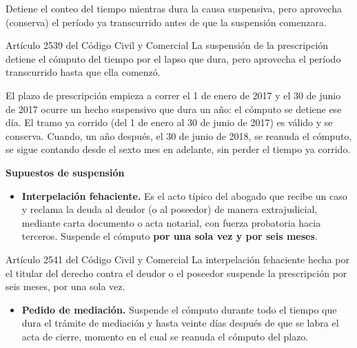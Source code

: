 \documentclass[12pt,oneside]{book}
\begin{document}
\begin{definicion}
Detiene el conteo del tiempo mientras dura la causa suspensiva, pero aprovecha (conserva) el período ya transcurrido antes de que la suspensión comenzara.
\end{definicion}

\begin{articulo}{Artículo 2539 del Código Civil y Comercial}
La suspensión de la prescripción detiene el cómputo del tiempo por el lapso que dura, pero aprovecha el período transcurrido hasta que ella comenzó.
\end{articulo}

\begin{ejemplo}
El plazo de prescripción empieza a correr el 1 de enero de 2017 y el 30 de junio de 2017 ocurre un hecho suspensivo que dura un año: el cómputo se detiene ese día. El tramo ya corrido (del 1 de enero al 30 de junio de 2017) es válido y se conserva. Cuando, un año después, el 30 de junio de 2018, se reanuda el cómputo, se sigue contando desde el sexto mes en adelante, sin perder el tiempo ya corrido.
\end{ejemplo}

\textbf{Supuestos de suspensión}

\begin{itemize}
    \item \textbf{Interpelación fehaciente.} Es el acto típico del abogado que recibe un caso y reclama la deuda al deudor (o al poseedor) de manera extrajudicial, mediante carta documento o acta notarial, con fuerza probatoria hacia terceros. Suspende el cómputo \textbf{por una sola vez y por seis meses}.
\end{itemize}

\begin{articulo}{Artículo 2541 del Código Civil y Comercial}
La interpelación fehaciente hecha por el titular del derecho contra el deudor o el poseedor suspende la prescripción por seis meses, por una sola vez.
\end{articulo}

\begin{itemize}
    \item \textbf{Pedido de mediación.} Suspende el cómputo durante todo el tiempo que dura el trámite de mediación y hasta veinte días después de que se labra el acta de cierre, momento en el cual se reanuda el cómputo del plazo.
\end{itemize}
\end{document}
